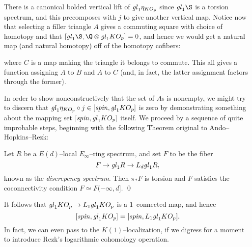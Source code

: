 There is a canonical bolded vertical lift of \(\mathit{gl}_1 \eta_{KO_p}\) since \(\gl_1 \S\) is a torsion spectrum, and this precomposes with \(j\) to give another vertical map.  Notice now that selecting a filler triangle \(A\) gives a commuting square with choice of homotopy and that \([\gl_1 \S, \Q \otimes \gl_1 KO_p] = 0\), and hence we would get a natural map (and natural homotopy) off of the homotopy cofibers:
\begin{center}
\end{center}
where \(C\) is a map making the triangle it belongs to commute.  This all gives a function assigning \(A\) to \(B\) and \(A\) to \(C\) (and, in fact, the latter assignment factors through the former).

In order to show nonconstructively that the set of \(A\)s is nonempty, we might try to discern that \(\mathit{gl}_1 \eta_{KO_p} \circ j \in [\mathit{spin}, \mathit{gl}_1 KO_p]\) is zero by demonstrating something about the mapping set \([\mathit{spin}, \mathit{gl}_1 KO_p]\) itself.  We proceed by a sequence of quite improbable steps, beginning with the following Theorem original to Ando--Hopkins--Rezk:
\begin{theorem}
Let \(R\) be a \(E(d)\)--local \(E_\infty\)--ring spectrum, and set \(F\) to be the fiber \[F \to \mathit{gl}_1 R \to L_d \mathit{gl}_1 R,\] known as the \textit{discrepency spectrum}.  Then \(\pi_* F\) is torsion and \(F\) satisfies the coconnectivity condition \(F \simeq F(-\infty, d]\). \qed
\end{theorem}

\noindent It follows that \(\mathit{gl}_1 KO_p \to L_1 \mathit{gl}_1 KO_p\) is a \(1\)--connected map, and hence \[[\mathit{spin}, \mathit{gl}_1 KO_p] = [\mathit{spin}, L_1 \mathit{gl}_1 KO_p].\]  In fact, we can even pass to the \(K(1)\)--localization, if we digress for a moment to introduce Rezk's logarithmic cohomology operation.

